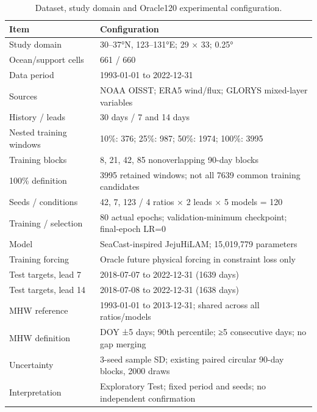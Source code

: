 \begin{table}
\caption{Dataset, study domain and Oracle120 experimental configuration.}
\label{tab:table1_setup}
\begin{tabular}{ll}
\toprule
Item & Configuration \\
\midrule
Study domain & 30–37°N, 123–131°E; 29 × 33; 0.25° \\
Ocean/support cells & 661 / 660 \\
Data period & 1993-01-01 to 2022-12-31 \\
Sources & NOAA OISST; ERA5 wind/flux; GLORYS mixed-layer variables \\
History / leads & 30 days / 7 and 14 days \\
Nested training windows & 10\%: 376; 25\%: 987; 50\%: 1974; 100\%: 3995 \\
Training blocks & 8, 21, 42, 85 nonoverlapping 90-day blocks \\
100\% definition & 3995 retained windows; not all 7639 common training candidates \\
Seeds / conditions & 42, 7, 123 / 4 ratios × 2 leads × 5 models = 120 \\
Training / selection & 80 actual epochs; validation-minimum checkpoint; final-epoch LR=0 \\
Model & SeaCast-inspired JejuHiLAM; 15,019,779 parameters \\
Training forcing & Oracle future physical forcing in constraint loss only \\
Test targets, lead 7 & 2018-07-07 to 2022-12-31 (1639 days) \\
Test targets, lead 14 & 2018-07-08 to 2022-12-31 (1638 days) \\
MHW reference & 1993-01-01 to 2013-12-31; shared across all ratios/models \\
MHW definition & DOY ±5 days; 90th percentile; ≥5 consecutive days; no gap merging \\
Uncertainty & 3-seed sample SD; existing paired circular 90-day blocks, 2000 draws \\
Interpretation & Exploratory Test; fixed period and seeds; no independent confirmation \\
\bottomrule
\end{tabular}
\end{table}
